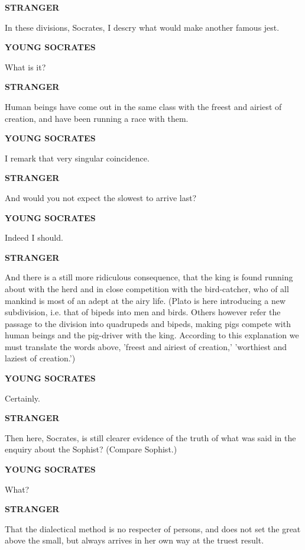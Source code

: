 \documentclass[11pt,letter]{article}
\begin{document}
\par \textbf{STRANGER}
\par   In these divisions, Socrates, I descry what would make another famous jest.

\par \textbf{YOUNG SOCRATES}
\par   What is it?

\par \textbf{STRANGER}
\par   Human beings have come out in the same class with the freest and airiest of creation, and have been running a race with them.

\par \textbf{YOUNG SOCRATES}
\par   I remark that very singular coincidence.

\par \textbf{STRANGER}
\par   And would you not expect the slowest to arrive last?

\par \textbf{YOUNG SOCRATES}
\par   Indeed I should.

\par \textbf{STRANGER}
\par   And there is a still more ridiculous consequence, that the king is found running about with the herd and in close competition with the bird-catcher, who of all mankind is most of an adept at the airy life. (Plato is here introducing a new subdivision, i.e. that of bipeds into men and birds. Others however refer the passage to the division into quadrupeds and bipeds, making pigs compete with human beings and the pig-driver with the king. According to this explanation we must translate the words above, 'freest and airiest of creation,' 'worthiest and laziest of creation.')

\par \textbf{YOUNG SOCRATES}
\par   Certainly.

\par \textbf{STRANGER}
\par   Then here, Socrates, is still clearer evidence of the truth of what was said in the enquiry about the Sophist? (Compare Sophist.)

\par \textbf{YOUNG SOCRATES}
\par   What?

\par \textbf{STRANGER}
\par   That the dialectical method is no respecter of persons, and does not set the great above the small, but always arrives in her own way at the truest result.
\end{document}
